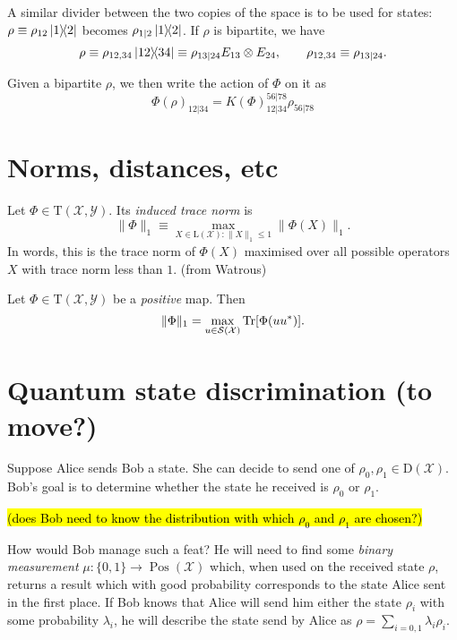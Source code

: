 \documentclass[12pt]{report}
\newcommand{\calY}{{\mathcal{Y}}}
\newcommand{\calS}{{\mathcal{S}}}
\newcommand{\calX}{{\mathcal{X}}}
\newcommand{\rmD}{{\mathrm{D}}}
\newcommand{\rmL}{{\mathrm{L}}}
\newcommand{\rmT}{{\mathrm{T}}}
\DeclareMathOperator{\Pos}{Pos}
\begin{document}
A similar divider between the two copies of the space is to be used for states:
$\rho \equiv \rho_{12}\ketbra{1}{2}$ becomes $\rho_{1|2}\ketbra{1}{2}$.
If $\rho$ is bipartite, we have
\begin{equation}
	\rho \equiv \rho_{12,34} \ketbra{12}{34} \equiv \rho_{13|24} E_{13}\otimes E_{24},
	\qquad
	\rho_{12,34} \equiv \rho_{13|24}.
\end{equation}


Given a bipartite $\rho$, we then write the action of $\Phi$ on it as
\begin{equation}
	\Phi(\rho)_{12|34} =
	K(\Phi)_{12|34}^{56|78} \rho_{56|78}
\end{equation}

\section{Norms, distances, etc}

\begin{defn}
	Let $\Phi\in\rmT(\calX,\calY)$. Its \emph{induced trace norm} is
	\begin{equation}
		\|\Phi\|_1 \equiv \max_{X\in\rmL(\calX): \|X\|_1\le 1}\|\Phi(X)\|_1.
	\end{equation}
	In words, this is the trace norm of $\Phi(X)$ maximised over all possible operators $X$ with trace norm less than $1$. (from Watrous)
\end{defn}

\begin{prop}
	Let $\Phi\in\rmT(\calX,\calY)$ be a \emph{positive} map. Then
	\begin{equation}
		\|\Phi\|_1 = \max_{u\in\calS(\calX)}\Tr[\Phi(uu^*)].
	\end{equation}
\end{prop}

\section{Quantum state discrimination (to move?)}

Suppose Alice sends Bob a state. She can decide to send one of $\rho_0,\rho_1\in\rmD(\calX)$. Bob's goal is to determine whether the state he received is $\rho_0$ or $\rho_1$.

\hl{(does Bob need to know the distribution with which $\rho_0$ and $\rho_1$ are chosen?)}

How would Bob manage such a feat? He will need to find some \emph{binary measurement} $\mu:\{0,1\}\to\Pos(\calX)$ which, when used on the received state $\rho$, returns a result which with good probability corresponds to the state Alice sent in the first place.
If Bob knows that Alice will send him either the state $\rho_i$ with some probability $\lambda_i$, he will describe the state send by Alice as
$\rho = \sum_{i=0,1} \lambda_i \rho_i$.
\end{document}
